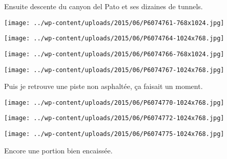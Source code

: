  

 Ensuite descente du canyon del Pato et ses dizaines de tunnels. 

 

\begin{center} \texttt{[image: ../wp-content/uploads/2015/06/P6074761-768x1024.jpg]} \end{center}

 

 

\begin{center} \texttt{[image: ../wp-content/uploads/2015/06/P6074764-1024x768.jpg]} \end{center}

 

 

\begin{center} \texttt{[image: ../wp-content/uploads/2015/06/P6074766-768x1024.jpg]} \end{center}

 

 

\begin{center} \texttt{[image: ../wp-content/uploads/2015/06/P6074767-1024x768.jpg]} \end{center}

 

 Puis je retrouve une piste non asphaltée, ça faisait un moment. 

 

\begin{center} \texttt{[image: ../wp-content/uploads/2015/06/P6074770-1024x768.jpg]} \end{center}

 

 

\begin{center} \texttt{[image: ../wp-content/uploads/2015/06/P6074772-1024x768.jpg]} \end{center}

 

 

\begin{center} \texttt{[image: ../wp-content/uploads/2015/06/P6074775-1024x768.jpg]} \end{center}

 

 Encore une portion bien encaissée. 

 

